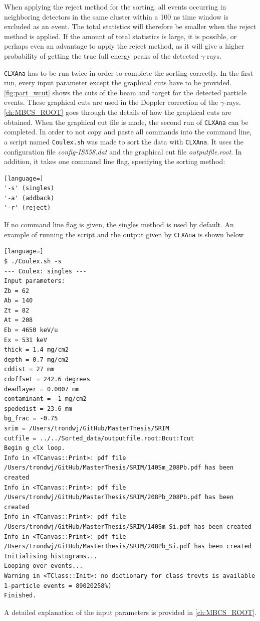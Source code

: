 \documentclass[twoside,english]{uiofysmaster/uiofysmaster}
\newcommand{\ga}{$\gamma$}
\let\orgautoref\autoref
\renewcommand{\autoref}
        {%
		 \def\sectionautorefname{Section}%
		 \def\subsectionautorefname{Section}%
		 \def\subsubsectionautorefname{Section}%
		 \def\chapterautorefname{Chapter}%
          \orgautoref}
\begin{document}
When applying the reject method for the sorting, all events occurring in neighboring detectors in the same cluster within a 100 ns time window is excluded as an event. 
The total statistics will therefore be smaller when the reject method is applied. 
If the amount of total statistics is large, it is possible, or perhaps even an advantage to apply the reject method, as it will give a higher probability of getting the true full energy peaks of the detected \ga-rays. 

\texttt{CLXAna} has to be run twice in order to complete the sorting correctly.
In the first run, every input parameter except the graphical cuts have to be provided.
\autoref{fig:part_wcut} shows the cuts of the beam and target for the detected particle events.
These graphical cuts are used in the Doppler correction of the \ga-rays.
\autoref{ch:MBCS_ROOT} goes through the details of how the graphical cuts are obtained.
When the graphical cut file is made, the second run of \texttt{CLXAna} can be completed. 
In order to not copy and paste all commands into the command line, a script named \texttt{Coulex.sh} was made to sort the data with \texttt{CLXAna}. 
It uses the configuration file \textit{config-IS558.dat} and the graphical cut file \textit{outputfile.root}. 
In addition, it takes one command line flag, specifying the sorting method:
\begin{lstlisting}[language=]
'-s' (singles) 
'-a' (addback) 
'-r' (reject)
\end{lstlisting}
If no command line flag is given, the singles method is used by default.
An example of running the script and the output given by \texttt{CLXAna} is shown below
\begin{lstlisting}[language=]
$ ./Coulex.sh -s
--- Coulex: singles ---
Input parameters:
Zb = 62
Ab = 140
Zt = 82
At = 208
Eb = 4650 keV/u
Ex = 531 keV
thick = 1.4 mg/cm2
depth = 0.7 mg/cm2
cddist = 27 mm
cdoffset = 242.6 degrees
deadlayer = 0.0007 mm
contaminant = -1 mg/cm2
spededist = 23.6 mm
bg_frac = -0.75
srim = /Users/trondwj/GitHub/MasterThesis/SRIM
cutfile = ../../Sorted_data/outputfile.root:Bcut:Tcut
Begin g_clx loop.
Info in <TCanvas::Print>: pdf file /Users/trondwj/GitHub/MasterThesis/SRIM/140Sm_208Pb.pdf has been created
Info in <TCanvas::Print>: pdf file /Users/trondwj/GitHub/MasterThesis/SRIM/208Pb_208Pb.pdf has been created
Info in <TCanvas::Print>: pdf file /Users/trondwj/GitHub/MasterThesis/SRIM/140Sm_Si.pdf has been created
Info in <TCanvas::Print>: pdf file /Users/trondwj/GitHub/MasterThesis/SRIM/208Pb_Si.pdf has been created
Initialising histograms...
Looping over events...
Warning in <TClass::Init>: no dictionary for class trevts is available
1-particle events = 89020258%)    
Finished.
\end{lstlisting}
A detailed explanation of the input parameters is provided in \autoref{ch:MBCS_ROOT}.
\end{document}
